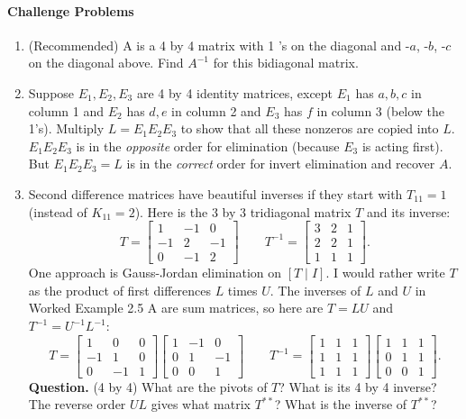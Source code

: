 \documentclass[14pt, a4paper]{article}
\begin{document}
\paragraph{Challenge Problems}
\begin{enumerate}[resume]
    \item (Recommended) A is a 4 by 4 matrix with 1 's on the diagonal and -$a$, -$b$, -$c$ on the diagonal above. Find $A^{-1}$ for this bidiagonal matrix.

    \item Suppose $E_1, E_2, E_3$ are 4 by 4 identity matrices, except $E_1$ has $a,b,c$ in column 1 and $E_2$ has $d,e$ in column 2 and $E_3$ has $f$ in column 3 (below the 1's). Multiply $L = E_1 E_2 E_3$ to show that all these nonzeros are copied into $L$.\\
          $E_1 E_2 E_3$ is in the \textit{opposite} order for elimination (because $E_3$ is acting first). But $E_1 E_2 E_3 = L$ is in the \textit{correct} order for invert elimination and recover $A$.

    \item Second difference matrices have beautiful inverses if they start with $T_{11} = 1$ (instead of $K_{11} = 2$). Here is the 3 by 3 tridiagonal matrix $T$ and its inverse:
          \[
              T = \begin{bmatrix} 1 & -1 & 0 \\ -1 & 2 & -1 \\ 0 & -1 & 2 \end{bmatrix}
              \qquad
              T^{-1} = \begin{bmatrix} 3 & 2 & 1 \\ 2 & 2 & 1 \\ 1 & 1 & 1 \end{bmatrix}.
          \]
          One approach is Gauss-Jordan elimination on $[T\mid I]$. I would rather write $T$ as the product of first differences $L$ times $U$. The inverses of $L$ and $U$ in Worked Example 2.5 A are sum matrices, so here are $T = LU$ and $T^{-1} = U^{-1}L^{-1}$:
          \[
              T = \begin{bmatrix} 1 & 0 & 0 \\ -1 & 1 & 0 \\ 0 & -1 & 1 \end{bmatrix}
              \begin{bmatrix} 1 & -1 & 0 \\ 0 & 1 & -1 \\ 0 & 0 & 1 \end{bmatrix}
              \qquad
              T^{-1} = \begin{bmatrix} 1 & 1 & 1 \\ 1 & 1 & 1 \\ 1 & 1 & 1 \end{bmatrix}
              \begin{bmatrix} 1 & 1 & 1 \\ 0 & 1 & 1 \\ 0 & 0 & 1 \end{bmatrix}.
          \]
          \textbf{Question.} (4 by 4) What are the pivots of $T$? What is its 4 by 4 inverse? The reverse order $UL$ gives what matrix $T^{**}$? What is the inverse of $T^{**}$?


\end{enumerate}
\end{document}
